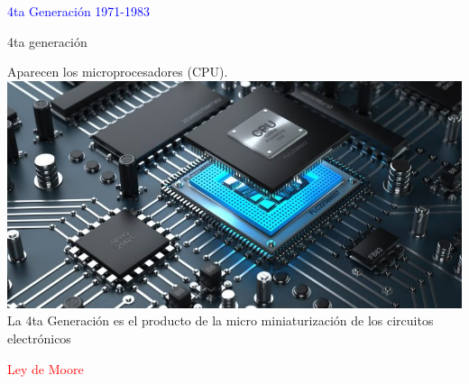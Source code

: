 \documentclass[10pt,xcolor={dvipsnames}]{beamer}
\begin{document}
\begin{frame}
\Huge{\textcolor{blue}{4ta Generación 1971-1983}}
\end{frame}

\begin{frame}{4ta generación}
\begin{center}
Aparecen los microprocesadores (CPU). \pause
\includegraphics[scale=0.4]{Figures/microprocesador} \pause
La 4ta Generación es el producto de la micro miniaturización de los circuitos electrónicos
\end{center}
\end{frame}

\begin{frame}
\begin{center}
\Huge{\textcolor{red}{Ley de Moore}}
\end{center}
\end{frame}
\end{document}
